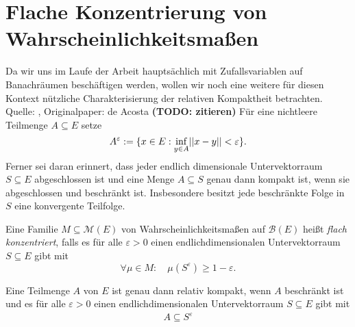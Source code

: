 \section{Flache Konzentrierung von Wahrscheinlichkeitsmaßen}
Da wir uns im Laufe der Arbeit hauptsächlich mit Zufallsvariablen auf Banachräumen beschäftigen werden, wollen wir noch eine weitere für diesen Kontext nützliche Charakterisierung der relativen Kompaktheit betrachten. 
Quelle: \cite{vakhania}, Originalpaper: de Acosta \textbf{(TODO: zitieren)}
Für eine nichtleere Teilmenge $A \subseteq E$ setze 
$$
    A^{\varepsilon} := \{x \in E: \inf_{y\in A}\lvert\lvert x-y \rvert\rvert < \varepsilon \}.
$$
Ferner sei daran erinnert, dass jeder endlich dimensionale Untervektorraum  $S \subseteq E$ abgeschlossen ist und eine Menge $A \subseteq S$ genau dann kompakt ist, wenn sie abgeschlossen und beschränkt ist. 
Insbesondere besitzt jede beschränkte Folge in $S$ eine konvergente Teilfolge. 
\begin{mydef}
    Eine Familie $M \subseteq \mathcal{M}(E)$ von Wahrscheinlichkeitsmaßen auf $\mathcal{B}(E)$ heißt \textit{flach konzentriert}, falls es für alle $\varepsilon > 0$ einen endlichdimensionalen 
    Untervektorraum $S \subseteq E$ gibt mit 
    $$
        \forall \mu \in M: \quad \mu(S^{\varepsilon}) \geq 1 - \varepsilon.
    $$ 
\end{mydef}

\begin{lemma}
    Eine Teilmenge $A$ von $E$ ist genau dann relativ kompakt, wenn $A$ beschränkt ist und es für alle $\varepsilon > 0$ einen endlichdimensionalen Untervektorraum $S \subseteq E$ gibt mit 
    \begin{align*}
        A \subseteq S^{\varepsilon}
    \end{align*}
\end{lemma}

